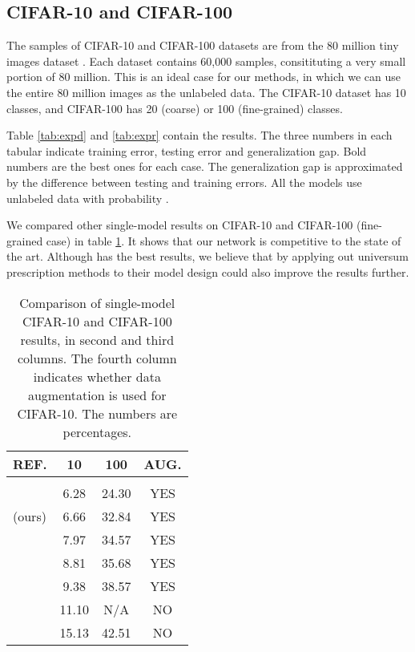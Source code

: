 \documentclass[letterpaper]{article}
\begin{document}
\subsection{CIFAR-10 and CIFAR-100}

The samples of CIFAR-10 and CIFAR-100 datasets \cite{K09} are from the 80 million tiny images dataset \cite{TFF08}. Each dataset contains 60,000 samples, consitituting a very small portion of 80 million. This is an ideal case for our methods, in which we can use the entire 80 million images as the unlabeled data. The CIFAR-10 dataset has 10 classes, and CIFAR-100 has 20 (coarse) or 100 (fine-grained) classes.

Table \ref{tab:expd} and \ref{tab:expr} contain the results. The three numbers in each tabular indicate training error, testing error and generalization gap. Bold numbers are the best ones for each case. The generalization gap is approximated by the difference between testing and training errors. All the models use unlabeled data with probability .

We compared other single-model results on CIFAR-10 and CIFAR-100 (fine-grained case) in table \ref{tab:cfcp}. It shows that our network is competitive to the state of the art. Although \cite{G14} has the best results, we believe that by applying out universum prescription methods to their model design could also improve the results further.

\begin{table}[h]
  \caption{Comparison of single-model CIFAR-10 and CIFAR-100 results, in second and third columns. The fourth column indicates whether data augmentation is used for CIFAR-10. The numbers are percentages.}
  \label{tab:cfcp}
  \begin{center}
    \begin{tabular}{lccc}
      \textbf{REF.} & \textbf{10} & \textbf{100} & \textbf{AUG.}
      \\ \hline \\
      \cite{G14} & 6.28 & 24.30 & YES \\
      (ours) & 6.66 & 32.84 & YES \\
      \cite{LXPZT15} & 7.97 & 34.57 & YES \\
      \cite{LCY13} & 8.81 & 35.68 & YES \\
      \cite{GWMCB13} & 9.38 & 38.57 & YES \\
      \cite{WZZLF13} & 11.10 & N/A & NO \\
      \cite{MR13} & 15.13 & 42.51 & NO \\
    \end{tabular}
  \end{center}
\end{table}
\end{document}
